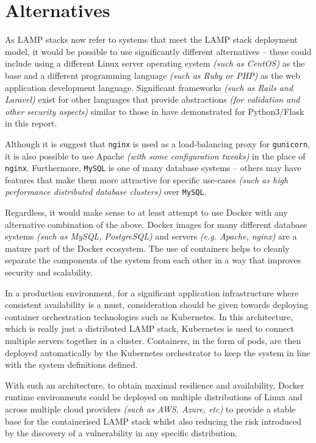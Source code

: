 \section{Alternatives}
As LAMP stacks now refer to systems that meet the LAMP stack deployment model, it would be possible to use significantly different alternatives -- these could include using a different Linux server operating system \textit{(such as CentOS)} as the base and a different programming language \textit{(such as Ruby or PHP)} as the web application development language. Significant frameworks \textit{(such as Rails and Laravel)} exist for other languages that provide abstractions \textit{(for validation and other security aspects)} similar to those in have demonstrated for Python3/Flask in this report.

Although it is suggest that \texttt{nginx} is used as a load-balancing proxy for \texttt{gunicorn}, it is also possible to use Apache \textit{(with some configuration tweaks)} in the place of \texttt{nginx}. Furthermore, \texttt{MySQL} is one of many database systems -- others may have features that make them more attractive for specific use-cases \textit{(such as high performance distributed database clusters)} over \texttt{MySQL}.

Regardless, it would make sense to at least attempt to use Docker with any alternative combination of the above. Docker images for many different database systems \textit{(such as MySQL, PostgreSQL)} and servers \textit{(e.g. Apache, nginx)} are a mature part of the Docker ecosystem. The use of containers helps to cleanly separate the components of the system from each other in a way that improves security and scalability.

In a production environment, for a significant application infrastructure where consistent availability is a must, consideration should be given towards deploying container orchestration technologies such as Kubernetes. In this architecture, which is really just a distributed LAMP stack, Kubernetes is used to connect multiple servers together in a cluster. Containers, in the form of pods, are then deployed automatically by the Kubernetes orchestrator to keep the system in line with the system definitions defined.

With such an architecture, to obtain maximal resilience and availability, Docker runtime environments could be deployed on multiple distributions of Linux and across multiple cloud providers \textit{(such as AWS, Azure, etc)} to provide a stable base for the containerised LAMP stack whilst also reducing the risk introduced by the discovery of a vulnerability in any specific distribution.
